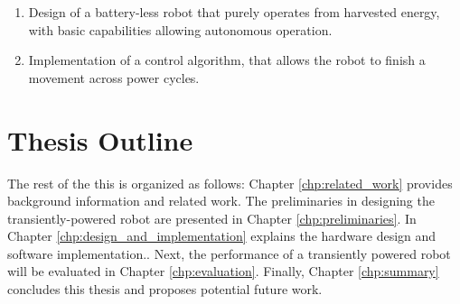 \begin{enumerate}


\item Design of a battery-less robot that purely operates from harvested energy, with basic capabilities allowing autonomous operation.

\item Implementation of a control algorithm, that allows the robot to finish a movement across power cycles.



\end{enumerate}


\section{Thesis Outline}

The rest of the this is organized as follows: Chapter \ref{chp:related_work} provides background information and related work.
The preliminaries in designing the transiently-powered robot are presented in Chapter \ref{chp:preliminaries}.
In Chapter \ref{chp:design_and_implementation} explains the hardware design and software implementation..
Next, the performance of a transiently powered robot will be evaluated in Chapter \ref{chp:evaluation}.
Finally, Chapter \ref{chp:summary} concludes this thesis and proposes potential future work.



